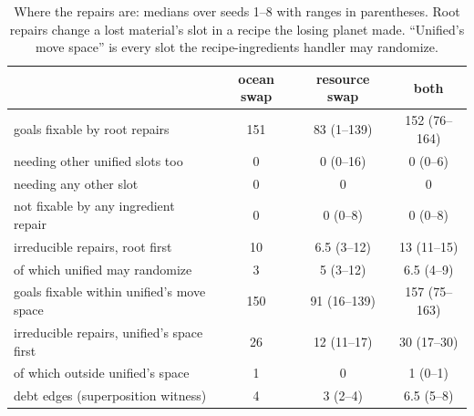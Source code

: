 \begin{table}[t]
\centering\small
\begin{tabular}{@{}l ccc@{}}
\toprule
 & ocean swap & resource swap & both \\
\midrule
goals fixable by root repairs & 151 & 83 (1--139) & 152 (76--164) \\
\quad needing other unified slots too & 0 & 0 (0--16) & 0 (0--6) \\
\quad needing any other slot & 0 & 0 & 0 \\
\quad not fixable by any ingredient repair & 0 & 0 (0--8) & 0 (0--8) \\
irreducible repairs, root first & 10 & 6.5 (3--12) & 13 (11--15) \\
\quad of which unified may randomize & 3 & 5 (3--12) & 6.5 (4--9) \\
goals fixable within unified's move space & 150 & 91 (16--139) & 157 (75--163) \\
irreducible repairs, unified's space first & 26 & 12 (11--17) & 30 (17--30) \\
\quad of which outside unified's space & 1 & 0 & 1 (0--1) \\
debt edges (superposition witness) & 4 & 3 (2--4) & 6.5 (5--8) \\
\bottomrule
\end{tabular}
\caption{Where the repairs are: medians over seeds 1--8 with ranges in parentheses. Root repairs change a lost material's slot in a recipe the losing planet made. ``Unified's move space'' is every slot the recipe-ingredients handler may randomize.}
\label{tab:where}
\end{table}
